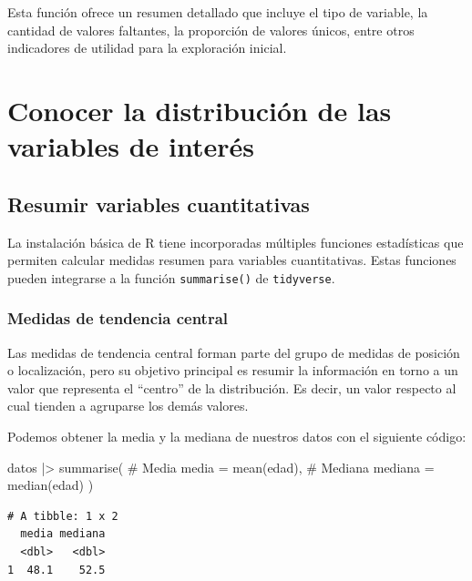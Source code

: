 \documentclass[
  spanish,
  letterpaper,
  DIV=11,
  numbers=noendperiod]{scrreprt}
\newenvironment{Shaded}{\begin{snugshade}}{\end{snugshade}}
\newcommand{\AttributeTok}[1]{\textcolor[rgb]{0.40,0.45,0.13}{#1}}
\newcommand{\CommentTok}[1]{\textcolor[rgb]{0.37,0.37,0.37}{#1}}
\newcommand{\FunctionTok}[1]{\textcolor[rgb]{0.28,0.35,0.67}{#1}}
\newcommand{\NormalTok}[1]{\textcolor[rgb]{0.00,0.23,0.31}{#1}}
\newcommand{\SpecialCharTok}[1]{\textcolor[rgb]{0.37,0.37,0.37}{#1}}
\begin{document}
Esta función ofrece un resumen detallado que incluye el tipo de
variable, la cantidad de valores faltantes, la proporción de valores
únicos, entre otros indicadores de utilidad para la exploración inicial.

\section{Conocer la distribución de las variables de
interés}\label{conocer-la-distribuciuxf3n-de-las-variables-de-interuxe9s}

\subsection{Resumir variables
cuantitativas}\label{resumir-variables-cuantitativas}

La instalación básica de R tiene incorporadas múltiples funciones
estadísticas que permiten calcular medidas resumen para variables
cuantitativas. Estas funciones pueden integrarse a la función
\texttt{summarise()} de \texttt{tidyverse}.

\subsubsection{Medidas de tendencia
central}\label{medidas-de-tendencia-central}

Las medidas de tendencia central forman parte del grupo de medidas de
posición o localización, pero su objetivo principal es resumir la
información en torno a un valor que representa el ``centro'' de la
distribución. Es decir, un valor respecto al cual tienden a agruparse
los demás valores.

Podemos obtener la media y la mediana de nuestros datos con el siguiente
código:

\begin{Shaded}
\begin{Highlighting}[]
\NormalTok{datos }\SpecialCharTok{|\textgreater{}}
  \FunctionTok{summarise}\NormalTok{(}
    \CommentTok{\# Media}
    \AttributeTok{media =} \FunctionTok{mean}\NormalTok{(edad),}
    \CommentTok{\# Mediana}
    \AttributeTok{mediana =} \FunctionTok{median}\NormalTok{(edad)}
\NormalTok{  )}
\end{Highlighting}
\end{Shaded}

\begin{verbatim}
# A tibble: 1 x 2
  media mediana
  <dbl>   <dbl>
1  48.1    52.5
\end{verbatim}
\end{document}
